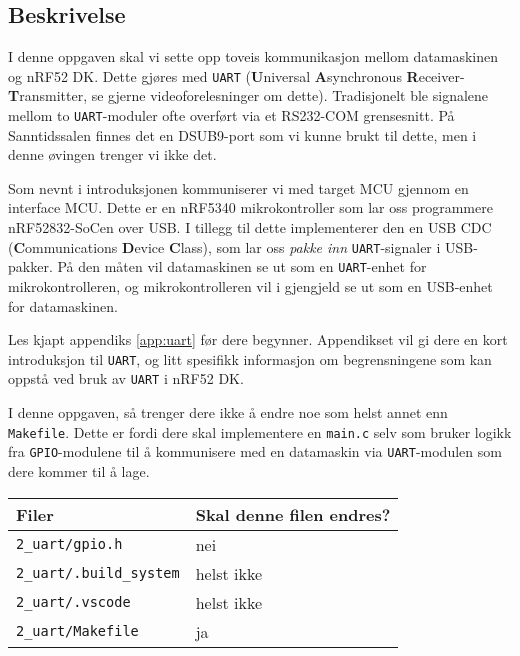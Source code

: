 \subsection{Beskrivelse}

I denne oppgaven skal vi sette opp toveis kommunikasjon mellom datamaskinen og nRF52 DK. Dette gjøres med \verb|UART| (\textbf{U}niversal \textbf{A}synchronous \textbf{R}eceiver-\textbf{T}ransmitter, se gjerne videoforelesninger om dette). Tradisjonelt ble signalene mellom to \verb|UART|-moduler ofte overført via et RS232-COM grensesnitt. På Sanntidssalen finnes det en DSUB9-port som vi kunne brukt til dette, men i denne øvingen trenger vi ikke det. 

Som nevnt i introduksjonen kommuniserer vi med target MCU gjennom en interface MCU. Dette er en nRF5340 mikrokontroller som lar oss programmere nRF52832-SoCen over USB. I tillegg til dette implementerer den en USB CDC (\textbf{C}ommunications \textbf{D}evice \textbf{C}lass), som lar oss \textit{pakke inn} \verb|UART|-signaler i USB-pakker. På den måten vil datamaskinen se ut som en \verb|UART|-enhet for mikrokontrolleren, og mikrokontrolleren vil i gjengjeld se ut som en USB-enhet for datamaskinen.

Les kjapt appendiks \ref{app:uart} før dere begynner. Appendikset vil gi dere en kort introduksjon til \verb|UART|, og litt spesifikk informasjon om begrensningene som kan oppstå ved bruk av \verb|UART| i nRF52 DK.

I denne oppgaven, så trenger dere ikke å endre noe som helst annet enn \verb|Makefile|. Dette er fordi dere skal implementere en \verb|main.c| selv som bruker logikk fra \verb|GPIO|-modulene til å kommunisere med en datamaskin via \verb|UART|-modulen som dere kommer til å lage.

\begin{center}
 \begin{tabular}{|p{8.5cm} p{5.5cm}|} 
 \hline
 Filer & Skal denne filen endres?  \\ [0.5ex] 
 \hline\hline
  \verb|2_uart/gpio.h| & \quad \quad \quad \quad nei  \\ 
  \hline
  \verb|2_uart/.build_system| &  \quad \quad \quad \quad helst ikke \\ 
  \hline
    \verb|2_uart/.vscode| &  \quad \quad \quad \quad helst ikke \\ 
 \hline
 \verb|2_uart/Makefile| &  \quad \quad \quad \quad ja \\ 
 \hline
\end{tabular}
\end{center}


